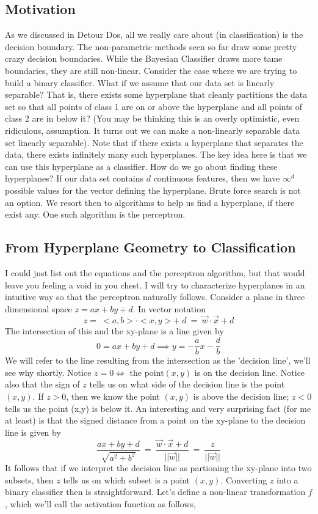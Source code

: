 \documentclass[10pt]{article}
\begin{document}
	\subsection*{Motivation}
		As we discussed in Detour Dos, all we really care about (in classification) is the decision boundary. 
		The non-parametric methods seen so far draw some pretty crazy decision boundaries. While the 
		Bayesian Classifier draws more tame boundaries, they are still non-linear. Consider the case where
		we are trying to build a binary classifier. What if we assume that our data set is linearly separable? 
		That is, there exists some hyperplane that cleanly partitions the data set so that all points of class 1
		are on or above the hyperplane and all points of class 2 are in below it? (You may be thinking this is 
		an overly optimistic, even ridiculous, assumption. It turns out we can make a non-linearly separable
		data set linearly separable). Note that if there exists a hyperplane that separates the data, there exists
		infinitely many such hyperplanes. The key idea here is that we can use this hyperplane as a classifier.
		How do we go about finding these hyperplanes? If our data set contains
		$d$ continuous features, then we have $\infty^d$ possible values for the vector defining the hyperplane.
		Brute force search is not an option. We resort then to algorithms to help us find a hyperplane, if there
		exist any. One such algorithm is the perceptron. 
		
	\subsection*{From Hyperplane Geometry to Classification}
		I could just list out the equations and the perceptron algorithm, but that would leave you feeling
		a void in you chest. I will try to characterize hyperplanes in an intuitive way so that the perceptron
		naturally follows. Consider a plane in three dimensional space $z = ax + by + d$. In vector notation 
		$$z = \ <a,b> \cdot <x,y> +  \ d  \ =  \ \vec w \cdot \vec x + d$$ 
		The intersection of this and the xy-plane is a line given by 
		$$0 = ax + by + d \implies y = -\frac{a}{b}x - \frac{d}{b}$$ 
		We will refer to the line resulting from the intersection as the 'decision line', we'll see why shortly. 
		Notice $z = 0 \iff $ the point$(x,y)$ is on the decision line. Notice also that the sign of $z$ tells
		us on what side of the decision line is the point $(x,y)$. If $z > 0$, then we know the point $(x,y)$ is 
		above the decision line; $z < 0$ tells us the point (x,y) is below it. An interesting 
		and very surprising fact (for me at least) is that the signed distance from a point on the xy-plane to the 
		decision line is given by 
		$$\frac{ax + by + d}{\sqrt{a^2 + b^2}} \ = \  \frac{\vec w \cdot \vec x + d}{|| \vec w||} \ = \  \frac{z}{|| \vec w||}$$
		It follows that if we interpret the decision line as partioning the xy-plane into two subsets, then $z$ tells 
		us on which subset is a point $(x,y)$. Converting $z$ into a binary classifier then is straightforward. 
		Let's define a non-linear transformation $f$, which we'll call the activation function as follows,
		
\end{document}

